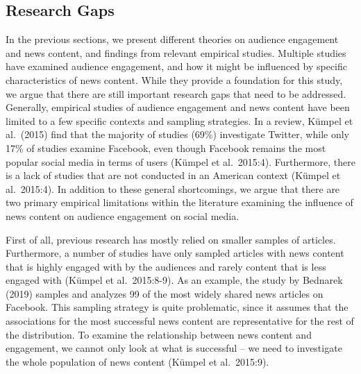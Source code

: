 \documentclass[
]{article}
\begin{document}
\hypertarget{research-gaps}{%
\subsection{Research Gaps}\label{research-gaps}}

In the previous sections, we present different theories on audience
engagement and news content, and findings from relevant empirical
studies. Multiple studies have examined audience engagement, and how it
might be influenced by specific characteristics of news content. While
they provide a foundation for this study, we argue that there are still
important research gaps that need to be addressed. Generally, empirical
studies of audience engagement and news content have been limited to a
few specific contexts and sampling strategies. In a review, Kümpel et
al.~(2015) find that the majority of studies (69\%) investigate Twitter,
while only 17\% of studies examine Facebook, even though Facebook
remains the most popular social media in terms of users (Kümpel et
al.~2015:4). Furthermore, there is a lack of studies that are not
conducted in an American context (Kümpel et al.~2015:4). In addition to
these general shortcomings, we argue that there are two primary
empirical limitations within the literature examining the influence of
news content on audience engagement on social media.

First of all, previous research has mostly relied on smaller samples of
articles. Furthermore, a number of studies have only sampled articles
with news content that is highly engaged with by the audiences and
rarely content that is less engaged with (Kümpel et al.~2015:8-9). As an
example, the study by Bednarek (2019) samples and analyzes 99 of the
most widely shared news articles on Facebook. This sampling strategy is
quite problematic, since it assumes that the associations for the most
successful news content are representative for the rest of the
distribution. To examine the relationship between news content and
engagement, we cannot only look at what is successful -- we need to
investigate the whole population of news content (Kümpel et al.~2015:9).
\end{document}
